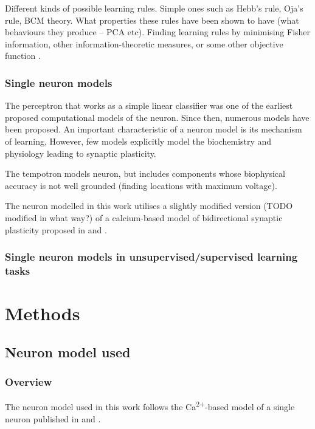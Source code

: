 \documentclass[a4paper,12pt]{report}
\theoremstyle{definition}
\begin{document}
Different kinds of possible learning rules. Simple ones such as Hebb's rule, Oja's rule, BCM theory. What properties these rules have been shown to have (what behaviours they produce -- PCA etc). Finding learning rules by minimising Fisher information, other information-theoretic measures, or some other objective function \cite{echeveste2014generating}.


\subsection{Single neuron models}


The perceptron \cite{rosenblatt1958perceptron} that works as a simple linear classifier was one of the earliest proposed computational models of the neuron. Since then, numerous models have been proposed. An important characteristic of a neuron model is its mechanism of learning, However, few models explicitly model the biochemistry and physiology leading to synaptic plasticity.

The tempotron \cite{gutig2006tempotron} models neuron, but includes components whose biophysical accuracy is not well grounded (finding locations with maximum voltage).

The neuron modelled in this work utilises a slightly modified version (TODO modified in what way?) of a calcium-based model of bidirectional synaptic plasticity proposed in \cite{shouval2002unified} and \cite{yeung2004synaptic}.

\subsection{Single neuron models in unsupervised/supervised learning tasks}




\chapter{Methods}
\section{Neuron model used}
\subsection{Overview}
The neuron model used in this work follows the Ca\textsuperscript{2+}-based model of a single neuron published in \cite{shouval2002unified} and \cite{yeung2004synaptic}.
\end{document}
